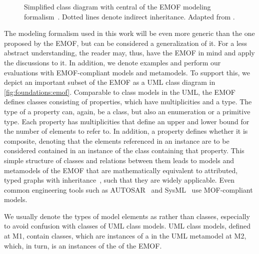 \begin{figure}
    \centering
    
    \caption[Relevant subset of \acrshort{EMOF} modeling formalism]{Simplified class diagram with central \metaclasses of the \gls{EMOF} modeling formalism~\cite[p.~27]{mof}. Dotted lines denote indirect inheritance. Adapted from \cite[Fig. 2.2]{kramer2017a}.}
    \label{fig:foundations:emof}
\end{figure}

The modeling formalism used in this work will be even more generic than the one proposed by the \gls{EMOF}, but can be considered a generalization of it.
For a less abstract understanding, the reader may, thus, have the \gls{EMOF} in mind and apply the discussions to it.
In addition, we denote examples and perform our evaluations with \gls{EMOF}-compliant models and metamodels.
To support this, we depict an important subset of the \gls{EMOF} \metametamodel as a \gls{UML} class diagram in \autoref{fig:foundations:emof}.
Comparable to class models in the \gls{UML}, the \gls{EMOF} defines classes consisting of properties, which have multiplicities and a type.
The type of a property can, again, be a class, but also an enumeration or a primitive type.
Each property has multiplicities that define an upper and lower bound for the number of elements to refer to.
In addition, a property defines whether it is composite, denoting that the elements referenced in an instance are to be considered contained in an instance of the class containing that property.
This simple structure of classes and relations between them leads to models and metamodels of the \gls{EMOF} that are mathematically equivalent to attributed, typed graphs with inheritance~\cite[Sec.~2.1.3.1]{kramer2017a}, such that they are widely applicable.
Even common engineering tools such as AUTOSAR~\cite{scheid2015autosar} and SysML~\cite{sysml} use \gls{MOF}-compliant models.

We usually denote the types of model elements as \emph{\metaclasses} rather than classes, especially to avoid confusion with classes of \gls{UML} class models.
\gls{UML} class models, defined at M1, contain classes, which are instances of a  \metaclass in the \gls{UML} metamodel at M2, which, in turn, is an instances of the  \metaclass of the \gls{EMOF}.


